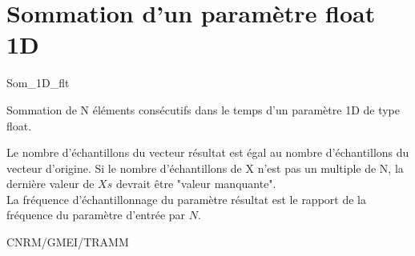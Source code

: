 %
\section{Sommation d'un param\`etre float 1D }

 {\sf Som\_1D\_flt}

Sommation de N \'el\'ements cons\'ecutifs 
dans le temps d'un param\`etre 1D de type float.


\bigskip






Le nombre d'\'echantillons du vecteur r\'esultat est \'egal au nombre
d'\'echantillons du vecteur d'origine.
Si le nombre d'\'echantillons de X n'est pas un multiple de N, la
derni\`ere valeur de $Xs$ devrait \^etre "valeur manquante".\\
La fr\'equence d'\'echantillonnage du param\`etre r\'esultat est le rapport de
la fr\'equence du param\`etre d'entr\'ee par $N$.

CNRM/GMEI/TRAMM

